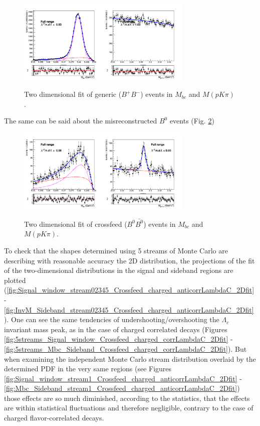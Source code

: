\begin{figure}[H]
\centering
{\includegraphics[width=0.75\textwidth]{06-chargedAnticorrBtoLambda/figs/streams12345_charged_anticorrLambdaC_Generic_2DFit.png}}
\caption{Two dimensional fit of generic ($B^+B^-$) events in $M_{bc}$  and $M(p K \pi)$.}
\label{fig:streams12345_charged_anticorrLambdaC_Generic_2DFit}
\end{figure}

The same can be said about the misreconstructed $B^0$ events (Fig. \ref{fig:stream12345_Crossfeed_charged_anticorrLambdaC_2Dfit})

\begin{figure}[H]
\centering
{\includegraphics[width=0.75\textwidth]{06-chargedAnticorrBtoLambda/figs/stream12345_Crossfeed_charged_anticorrLambdaC_2Dfit.png}}
\caption{Two dimensional fit of crossfeed ($B^0\bar{B^0}$) events in $M_{bc}$  and $M(p K \pi)$.}
\label{fig:stream12345_Crossfeed_charged_anticorrLambdaC_2Dfit}
\end{figure}

\noindent To check that the shapes determined using 5 streams of Monte Carlo are describing with reasonable accuracy the 2D distribution, the projections of the fit of the two-dimensional distributions in the signal and sideband regions are plotted (\cref{fig:Signal_window_stream02345_Crossfeed_charged_anticorrLambdaC_2Dfit} - \cref{fig:InvM_Sideband_stream02345_Crossfeed_charged_anticorrLambdaC_2Dfit}).
One can see the same tendencies of undershooting/overshooting the $\Lambda_c$ invariant mass peak, as in the case of charged correlated decays  (Figures \ref{fig:5streams_Signal_window_Crossfeed_charged_corrLambdaC_2Dfit} - \ref{fig:5streams_Mbc_Sideband_Crossfeed_charged_corrLambdaC_2Dfit}).
But when examining the independent Monte Carlo stream distribution overlaid by the determined PDF in the very same regions (see Figures \ref{fig:Signal_window_stream1_Crossfeed_charged_anticorrLambdaC_2Dfit} -\ref{fig:Mbc_Sideband_stream1_Crossfeed_charged_anticorrLambdaC_2Dfit})
those effects are so much diminished, according to the statistics, that the effects are within statistical fluctuations and therefore negligible, contrary to the case of charged flavor-correlated decays.


